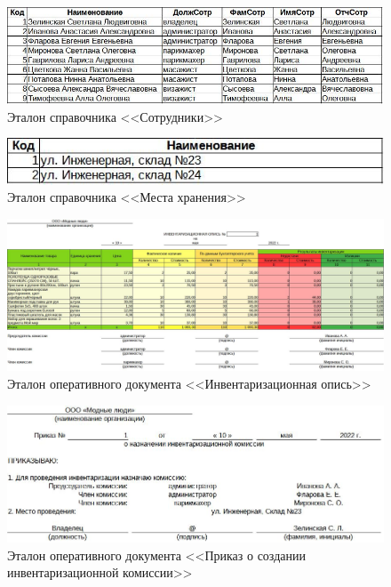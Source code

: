 \begin{figure}[!h]
    \centering
    \includegraphics[]
        {_docs/СП_Сотр_эталон.jpg}
    \caption{Эталон справочника <<Сотрудники>>}
    \label{fig:CP_Sotrudniki_etalon}
\end{figure}

\begin{figure}[!h]
    \centering
    \includegraphics[]
        {_docs/СП_МестаХран_эталон.jpg}
    \caption{Эталон справочника <<Места хранения>>}
    \label{fig:CP_MestaXran_etalon}
\end{figure}

\begin{figure}[!h]
    \centering
    \includegraphics[width=18cm]
        {_docs/ОП_ИнвенОпис_эталон.jpg}
    \caption{Эталон оперативного документа <<Инвентаризационная опись>>}
    \label{fig:OP_InvenOpis_etalon}
\end{figure}

\begin{figure}[!h]
    \centering
    \includegraphics[width=18cm]
        {_docs/ОП_ПриказСоздКомИнвент_эталон.jpg}
    \caption{Эталон оперативного документа <<Приказ о создании инвентаризационной комиссии>>}
    \label{fig:OP_PrikazSozdKomInvest_etalon}
\end{figure}
